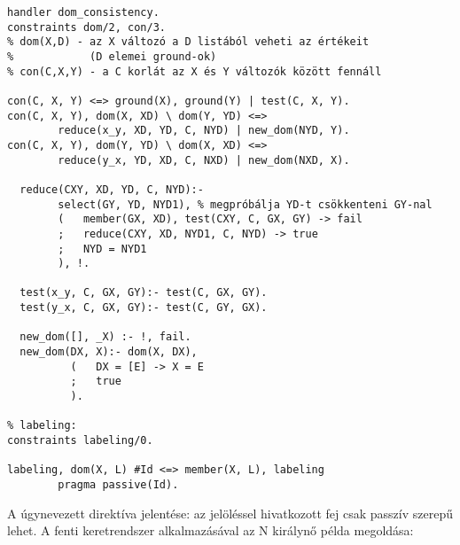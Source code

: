\begin{verbatim}
handler dom_consistency.
constraints dom/2, con/3.
% dom(X,D) - az X változó a D listából veheti az értékeit
%            (D elemei ground-ok)
% con(C,X,Y) - a C korlát az X és Y változók között fennáll

con(C, X, Y) <=> ground(X), ground(Y) | test(C, X, Y).
con(C, X, Y), dom(X, XD) \ dom(Y, YD) <=> 
        reduce(x_y, XD, YD, C, NYD) | new_dom(NYD, Y).
con(C, X, Y), dom(Y, YD) \ dom(X, XD) <=> 
        reduce(y_x, YD, XD, C, NXD) | new_dom(NXD, X).

  reduce(CXY, XD, YD, C, NYD):- 
        select(GY, YD, NYD1), % megpróbálja YD-t csökkenteni GY-nal
        (   member(GX, XD), test(CXY, C, GX, GY) -> fail
        ;   reduce(CXY, XD, NYD1, C, NYD) -> true
        ;   NYD = NYD1
        ), !.

  test(x_y, C, GX, GY):- test(C, GX, GY).
  test(y_x, C, GX, GY):- test(C, GY, GX).

  new_dom([], _X) :- !, fail.
  new_dom(DX, X):- dom(X, DX),
          (   DX = [E] -> X = E
          ;   true
          ).

% labeling:
constraints labeling/0.

labeling, dom(X, L) #Id <=> member(X, L), labeling
        pragma passive(Id).
\end{verbatim}

A  úgynevezett  direktíva jelentése: az 
jelöléssel hivatkozott fej csak passzív szerepű lehet. A fenti keretrendszer
alkalmazásával az N királynő példa megoldása:

